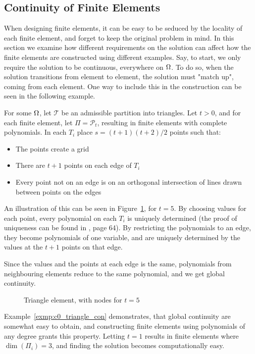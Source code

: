 \subsection{Continuity of Finite Elements}
When designing finite elements, it can be easy to be seduced by the 
locality of each finite element, and forget to keep the original 
problem in mind. In this section we examine how different requirements 
on the solution can affect how the finite elements are constructed 
using different examples.
Say, to start, we only require the solution to be continuous, 
everywhere on $\Omega$.
To do so, when the solution transitions from element to element, 
the solution must "match up", coming from each element. 
One way to include this in the construction can be seen in the 
following example.
\begin{exmp}{\quad\label{exmp:c0_triangle_con}}
For some $\Omega$, let $\mathcal{T}$ be an admissible partition into 
triangles. 
Let $t >0$, and for each finite element, let $\Pi = \mathcal{P}_t$, resulting 
in finite elements with complete polynomials.
In each $T_i$ place
$s = (t+1)(t+2)/2$ points such that:
\begin{itemize}
    \item The points create a grid
    \item There are $t+1$ points on each edge of $T_i$
    \item Every point not on an edge is on an orthogonal intersection of lines drawn between points on the edges 
\end{itemize} 
An illustration of this can be seen in Figure~\ref{fig:triangle_nodal}, for 
$t=5$.
By choosing values for each point, every polynomial on each $T_i$ 
is uniquely determined (the proof of uniqueness can be found in 
\cite{Braess}, page 64).
By restricting the polynomials to an edge, they become polynomials of 
one variable, and are uniquely determined by the values at the $t+1$ points 
on that edge.

Since the values and the points at each edge is the same, polynomials from 
neighbouring elements reduce to the same polynomial, and we get global 
continuity.
\end{exmp}
\begin{figure}[h]
    \centering
    
    \caption{Triangle element, with nodes for $t=5$}
    \label{fig:triangle_nodal}
\end{figure}
Example~\ref{exmp:c0_triangle_con} demonstrates, that global continuity are 
somewhat easy to obtain, and constructing finite elements using polynomials 
of any degree grants this property. Letting $t=1$ results in finite elements 
where $\dim(\Pi_i)=3$, and finding the solution becomes computationally 
easy.

